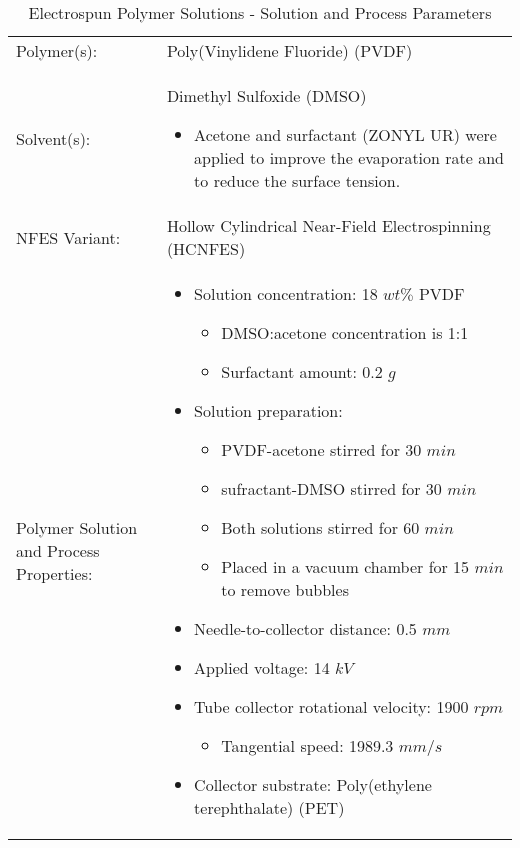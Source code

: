 \begin{table}[th]
\caption{Electrospun Polymer Solutions - Solution and Process Parameters}
\begin{center}
\begin{tabular}{
>{\raggedright\arraybackslash}p{}
>{\raggedright\arraybackslash}p{} }

\hline
Polymer(s): &
Poly(Vinylidene Fluoride) (PVDF) \\

\arrayrulecolor{lightgray}\hline
Solvent(s): &
Dimethyl Sulfoxide (DMSO)
    \begin{itemize}[leftmargin=*]
    \item Acetone and surfactant (ZONYL UR) were applied to improve the evaporation rate and to reduce the surface tension.
    \end{itemize} \\

\hline
NFES Variant: &
Hollow Cylindrical Near-Field Electrospinning (HCNFES) \\

\hline
Polymer Solution and Process Properties: &
\begin{itemize}[leftmargin=*]
\item Solution concentration: 18 $w t \%$ PVDF
    \begin{itemize}[leftmargin=*]
    \item DMSO:acetone concentration is 1:1
    \item Surfactant amount: 0.2 $g$
    \end{itemize}
\item Solution preparation:
    \begin{itemize}[leftmargin=*]
    \item PVDF-acetone stirred for 30 $min$
    \item sufractant-DMSO stirred for 30 $min$
    \item Both solutions stirred for 60 $min$
    \item Placed in a vacuum chamber for 15 $min$ to remove bubbles
    \end{itemize}
\item Needle-to-collector distance: 0.5 $m m$
\item Applied voltage: 14 $k V$
\item Tube collector rotational velocity: 1900 $rpm$
    \begin{itemize}[leftmargin=*]
    \item Tangential speed: 1989.3 $m m / s$
    \end{itemize}
\item Collector substrate: Poly(ethylene terephthalate) (PET)
\end{itemize} \\


\end{tabular}
\end{center}
\end{table}

